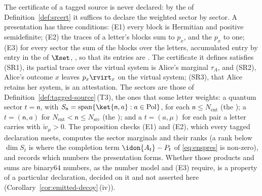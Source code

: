 
The certificate of a tagged source is never declared: by the
 of Definition~\ref{def:srcert} it suffices to
declare the weighted  sector by sector. A presentation
has three conditions: (E1) every block is Hermitian and positive semidefinite;
(E2) the traces of a letter's blocks sum to $p_x$, and the $p_x$ to one; (E3)
for every sector the sum of the blocks over the letters, accumulated entry by
entry in the  of $\Xset$, , so that
its entries are . The
certificate it defines satisfies (SR1), its partial trace over the virtual
system is Alice's marginal $\tau_A$, and (SR2), Alice's outcome $x$ leaves
$p_x\rvirt_x$ on the virtual system; (SR3), that Alice retains her system, is
an attestation. The sectors are those of
Definition~\ref{def:tagged-source}\,(T3), the ones that some letter weights: a
quantum sector $t=\mathsf{n}$, with
$S_{\mathsf{n}}=\operatorname{span}\{\ket{\mathsf{n},a}:a\in\mathrm{Pol}\}$, for
each $\mathsf{n}\le N_{\mathrm{ent}}$ (the ); a
 $t=(\mathsf{n},a)$ for
$N_{\mathrm{ent}}<\mathsf{n}\le N_{\mathrm{src}}$ (the ); and
a  $t=(a,\mu)$ for each pair a letter carries with
$\tilde w_\mu>0$. The proposition checks (E1) and (E2), which every tagged
declaration meets, computes the sector marginals and their ranks (a rank below
$\dim S_t$ is where the completion term $\idon{A_t}-P_t$ of \eqref{eq:enspres}
is non-zero), and records which numbers the presentation forms. Whether those
products and sums are binary64 numbers, as the number model and (E3) require,
is a property of a particular declaration, decided on it and not asserted here
(Corollary~\ref{cor:emitted-decoy}\,(iv)).

